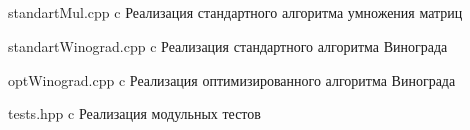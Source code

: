 \begin{appendices}
	\chapter{}
	\label{a:appendices}
	{standartMul.cpp}
	{c}
	{Реализация стандартного алгоритма умножения матриц}

	{standartWinograd.cpp}
	{c}
	{Реализация стандартного алгоритма Винограда}

	{optWinograd.cpp}
	{c}
	{Реализация оптимизированного алгоритма Винограда}

	{tests.hpp}
	{c}
	{Реализация модульных тестов}
\end{appendices}
